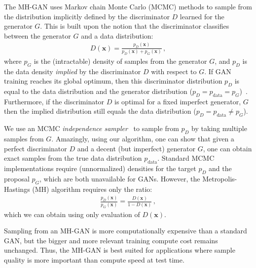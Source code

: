 \documentclass{article}
\renewcommand{\vec}[1]{{\boldsymbol{\mathbf{#1}}}} %
\newcommand{\PG}{{p_G}}
\newcommand{\PD}{{p_D}}
\newcommand{\PR}{{p_{\textrm{data}}}}
\begin{document}
The MH-GAN uses Markov chain Monte Carlo (MCMC) methods to sample from the distribution implicitly defined by the discriminator $D$ learned for the generator $G$.
This is built upon the notion that the discriminator classifies between the generator $G$ and a data distribution:
\begin{align}
  D(\vec x) = \frac{\PD(\vec x)}{\PD(\vec x) + \PG(\vec x)} \,, \label{eq:define PD}
\end{align}
where $\PG$ is the (intractable) density of samples from the generator $G$, and $\PD$ is the data density \emph{implied} by the discriminator $D$ with respect to $G$.
If GAN training reaches its global optimum, then this discriminator distribution $\PD$ is equal to the data distribution and the generator distribution ($\PD = \PR = \PG$)~\citep{Goodfellow2014}.
Furthermore, if the discriminator $D$ is optimal for a fixed imperfect generator, $G$ then the implied distribution still equals the data distribution ($\PD = \PR \neq \PG$)\@.



We use an MCMC \emph{independence sampler}~\citep{Tierney1994} to sample from $\PD$ by taking multiple samples from $G$\@.
Amazingly, using our algorithm, one can show that given a perfect discriminator $D$ and a decent (but imperfect) generator $G$, one can obtain exact samples from the true data distribution $\PR$.
Standard MCMC implementations require (unnormalized) densities for the target $\PD$ and the proposal $\PG$, which are both unavailable for GANs.
However, the Metropolis-Hastings (MH) algorithm requires only the ratio:
\begin{align}
  \frac{\PD(\vec x)}{\PG(\vec x)} = \frac{D(\vec x)}{1 - D(\vec x)}\,, \label{eq:PD inv}
\end{align}
which we can obtain using only evaluation of $D(\vec x)$.

Sampling from an MH-GAN is more computationally expensive than a standard GAN, but the bigger and more relevant training compute cost remains unchanged.
Thus, the MH-GAN is best suited for applications where sample quality is more important than compute speed at test time.

\end{document}
